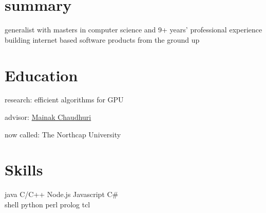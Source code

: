 
\begin{minipage}[t]{0.32\textwidth} %

\section{summary}
\location{}
generalist with masters in computer science and 9+ years' professional experience building internet based software products from the ground up
\sectionspace %

\section{Education} 
\vspace{\topsep} %
\vspace{1pt}
\begin{tightitemize}
\item research: efficient algorithms for GPU
\item advisor: \href{https://www.cse.iitk.ac.in/users/mainakc/}{Mainak Chaudhuri} 
\end{tightitemize}
\vspace{6pt}

\begin{tightitemize}
\item now called: The Northcap University
\end{tightitemize}



\sectionspace %

\section{Skills}

java \textbullet{} C/C++ \textbullet{} Node.js \textbullet{} Javascript \textbullet{} C\#\\ 
shell \textbullet{} python \textbullet{} perl \textbullet{} prolog \textbullet{} tcl\\
\sectionspace %


\end{minipage}
